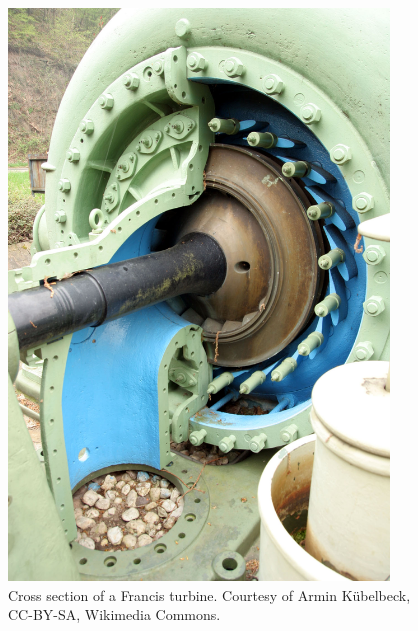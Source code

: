         \begin{figure}
            \begin{minipage}[b]{0.5\linewidth}
                \centering
                \includegraphics[width = 0.9\textwidth]{report/figures/introduction/francis_turbine.jpg}
                \caption{Cross section of a Francis turbine. Courtesy of Armin Kübelbeck, CC-BY-SA, Wikimedia Commons.} %
                \label{fig:francis}
            \end{minipage}
            \begin{minipage}[b]{0.5\linewidth}
                \centering

\end{minipage}
\end{figure}
